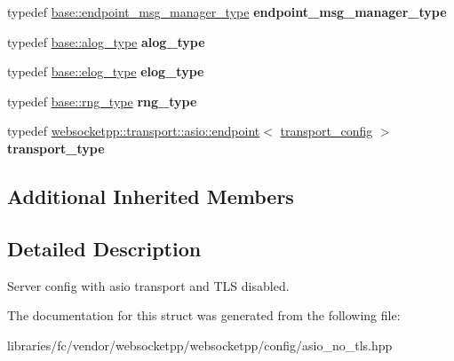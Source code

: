 \begin{DoxyCompactItemize}
\item 
\mbox{\label{structwebsocketpp_1_1config_1_1asio_a5cc654513cddc3bc7d15ed37b2427150}} 
typedef \mbox{\hyperlink{classwebsocketpp_1_1message__buffer_1_1alloc_1_1endpoint__msg__manager}{base\+::endpoint\+\_\+msg\+\_\+manager\+\_\+type}} {\bfseries endpoint\+\_\+msg\+\_\+manager\+\_\+type}
\item 
\mbox{\label{structwebsocketpp_1_1config_1_1asio_a128280d7b2ff8256e10f23050a89549d}} 
typedef \mbox{\hyperlink{classwebsocketpp_1_1log_1_1basic}{base\+::alog\+\_\+type}} {\bfseries alog\+\_\+type}
\item 
\mbox{\label{structwebsocketpp_1_1config_1_1asio_a67f2a92d70443a37f25ffbc08a6a9c3d}} 
typedef \mbox{\hyperlink{structwebsocketpp_1_1config_1_1core_ac037ffb73b675a6251f3b86433b4eb17}{base\+::elog\+\_\+type}} {\bfseries elog\+\_\+type}
\item 
\mbox{\label{structwebsocketpp_1_1config_1_1asio_afb20244eb1c988b20a5821ec04ac4f80}} 
typedef \mbox{\hyperlink{structwebsocketpp_1_1config_1_1core_a245db33d05f7994d221db66f506ab8c6}{base\+::rng\+\_\+type}} {\bfseries rng\+\_\+type}
\item 
\mbox{\label{structwebsocketpp_1_1config_1_1asio_af600118e4ba565fa6e5063490e9e7047}} 
typedef \mbox{\hyperlink{classwebsocketpp_1_1transport_1_1asio_1_1endpoint}{websocketpp\+::transport\+::asio\+::endpoint}}$<$ \mbox{\hyperlink{structwebsocketpp_1_1config_1_1asio_1_1transport__config}{transport\+\_\+config}} $>$ {\bfseries transport\+\_\+type}
\end{DoxyCompactItemize}
\subsection*{Additional Inherited Members}


\subsection{Detailed Description}
Server config with asio transport and T\+LS disabled. 

The documentation for this struct was generated from the following file\+:\begin{DoxyCompactItemize}
\item 
libraries/fc/vendor/websocketpp/websocketpp/config/asio\+\_\+no\+\_\+tls.\+hpp\end{DoxyCompactItemize}
